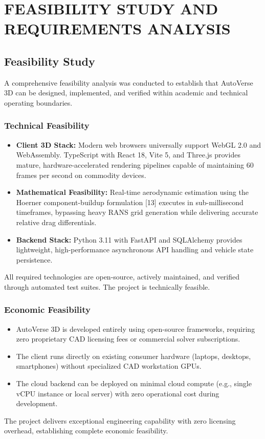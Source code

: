 \documentclass[12pt,a4paper]{report}
\begin{document}
\chapter{FEASIBILITY STUDY AND REQUIREMENTS ANALYSIS}

\section{Feasibility Study}
A comprehensive feasibility analysis was conducted to establish that AutoVerse 3D can be designed, implemented, and verified within academic and technical operating boundaries.

\subsection{Technical Feasibility}
\begin{itemize}
    \item \textbf{Client 3D Stack:} Modern web browsers universally support WebGL 2.0 and WebAssembly. TypeScript with React 18, Vite 5, and Three.js provides mature, hardware-accelerated rendering pipelines capable of maintaining 60 frames per second on commodity devices.
    \item \textbf{Mathematical Feasibility:} Real-time aerodynamic estimation using the Hoerner component-buildup formulation [13] executes in sub-millisecond timeframes, bypassing heavy RANS grid generation while delivering accurate relative drag differentials.
    \item \textbf{Backend Stack:} Python 3.11 with FastAPI and SQLAlchemy provides lightweight, high-performance asynchronous API handling and vehicle state persistence.
\end{itemize}
All required technologies are open-source, actively maintained, and verified through automated test suites. The project is technically feasible.

\subsection{Economic Feasibility}
\begin{itemize}
    \item AutoVerse 3D is developed entirely using open-source frameworks, requiring zero proprietary CAD licensing fees or commercial solver subscriptions.
    \item The client runs directly on existing consumer hardware (laptops, desktops, smartphones) without specialized CAD workstation GPUs.
    \item The cloud backend can be deployed on minimal cloud compute (e.g., single vCPU instance or local server) with zero operational cost during development.
\end{itemize}
The project delivers exceptional engineering capability with zero licensing overhead, establishing complete economic feasibility.
\end{document}
